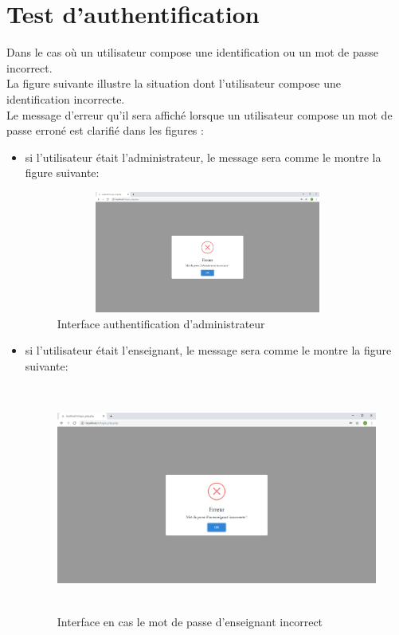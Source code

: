 \documentclass[12 pt ]{report}
\begin{document}
\section{Test d'authentification }
Dans le cas où un utilisateur compose une identification ou un mot de passe incorrect. \\
La figure suivante illustre la situation dont l'utilisateur compose une identification  incorrecte.\\
Le message d'erreur qu'il sera affiché lorsque un utilisateur compose un mot de passe erroné est clarifié dans les figures  :
\begin{itemize}[label=]
\item si l'utilisateur était l'administrateur, le message sera comme le montre la figure suivante:
\begin{figure}[h]
\begin{center}
\includegraphics[width=10cm,height=4cm]{login3.png}
\caption{ Interface authentification d'administrateur }
\end{center}
\end{figure}
\item si l'utilisateur était l'enseignant, le message sera comme le montre la figure suivante:
\begin{figure}[h]
\begin{center}
\includegraphics[width=14cm,height=7.5cm]{login6.png}
\caption{Interface en cas le mot de passe d'enseignant incorrect}
\end{center}
\end{figure}


\end{itemize}
\end{document}
